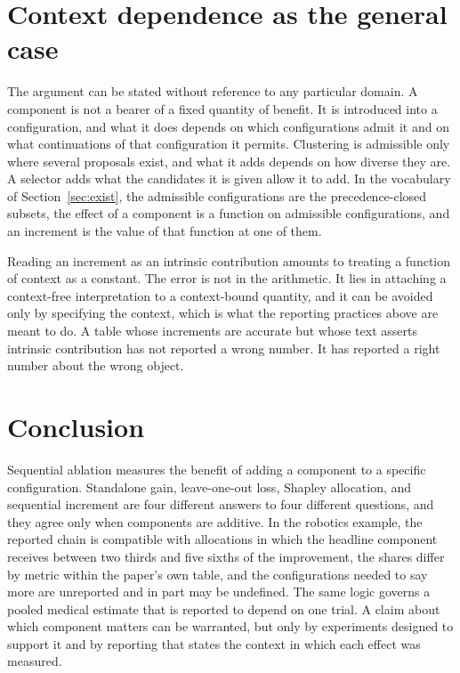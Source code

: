 \documentclass[11pt]{article}
\theoremstyle{plain}
\theoremstyle{remark}
\begin{document}
\section{Context dependence as the general case}\label{sec:context}

The argument can be stated without reference to any particular domain. A component is not a bearer of a fixed quantity of benefit. It is introduced into a configuration, and what it does depends on which configurations admit it and on what continuations of that configuration it permits. Clustering is admissible only where several proposals exist, and what it adds depends on how diverse they are. A selector adds what the candidates it is given allow it to add. In the vocabulary of Section~\ref{sec:exist}, the admissible configurations are the precedence-closed subsets, the effect of a component is a function on admissible configurations, and an increment is the value of that function at one of them.

Reading an increment as an intrinsic contribution amounts to treating a function of context as a constant. The error is not in the arithmetic. It lies in attaching a context-free interpretation to a context-bound quantity, and it can be avoided only by specifying the context, which is what the reporting practices above are meant to do. A table whose increments are accurate but whose text asserts intrinsic contribution has not reported a wrong number. It has reported a right number about the wrong object.

\section{Conclusion}

Sequential ablation measures the benefit of adding a component to a specific configuration. Standalone gain, leave-one-out loss, Shapley allocation, and sequential increment are four different answers to four different questions, and they agree only when components are additive. In the robotics example, the reported chain is compatible with allocations in which the headline component receives between two thirds and five sixths of the improvement, the shares differ by metric within the paper's own table, and the configurations needed to say more are unreported and in part may be undefined. The same logic governs a pooled medical estimate that is reported to depend on one trial. A claim about which component matters can be warranted, but only by experiments designed to support it and by reporting that states the context in which each effect was measured.
\end{document}
